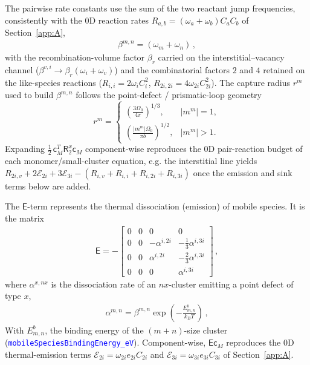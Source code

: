 \documentclass{article}
\newcommand{\textttclr}[1]{\textcolor{blue}{\texttt{#1}}}
\newcommand{\spvec}[1]{\bm{\mathsf{#1}}}   %
\newcommand{\spmat}[1]{\bm{\mathsf{#1}}}   %
\begin{document}
The pairwise rate constants use the sum of the two reactant jump frequencies, consistently with the $0$D reaction rates $R_{a,b}=(\omega_a+\omega_b)C_aC_b$ of Section~\ref{app:A},
\begin{align}\label{eq:beta}
\beta^{m,n}=(\omega_m+\omega_n)\, ,
\end{align}
with the recombination-volume factor $\beta_r$ carried on the interstitial--vacancy channel ($\beta^{v,i}\to\beta_r(\omega_i+\omega_v)$) and the combinatorial factors $2$ and $4$ retained on the like-species reactions ($R_{i,i}=2\omega_iC_i^2$, $R_{2i,2i}=4\omega_{2i}C_{2i}^2$). The capture radius $r^m$ used to build $\beta^{m,n}$ follows the point-defect / prismatic-loop geometry
\begin{equation}
    r^m =
    \begin{cases}
        \displaystyle
        \left(\frac{3\Omega_0}{4\pi}\right)^{1/3},
        & \left|m^m\right|=1,
        \\[10pt]
        \displaystyle
        \left(\frac{\left|m^m\right|\Omega_0}{\pi b}\right)^{1/2},
        & \left|m^m\right|>1.
    \end{cases}
    \label{eq:mobile_capture_radius}
\end{equation}
Expanding $\tfrac12\,\spvec{c}_M^T\spmat{R}_2^{x}\spvec{c}_M$ component-wise reproduces the $0$D pair-reaction budget of each monomer/small-cluster equation, e.g. the interstitial line yields $R_{2i,v}+2\mathcal{E}_{2i}+3\mathcal{E}_{3i}-(R_{i,v}+R_{i,i}+R_{i,2i}+R_{i,3i})$ once the emission and sink terms below are added.

The $\spmat{E}$-term represents the thermal dissociation (emission) of mobile species. It is the matrix
\begin{align}\label{Eq:R1}
   {\spmat{E}} =  -
\begin{bmatrix}
 0 & 0 & 0 & 0 \\ 
0 & 0 & -\alpha^{i,2i} & -\tfrac{1}{3}\alpha^{i,3i}\\ 
0 & 0 & \alpha^{i,2i} & -\tfrac{2}{3}\alpha^{i,3i} \\ 
0 & 0 & 0 &    \alpha^{i,3i}
\end{bmatrix}\, ,
\end{align}
where $\alpha^{x,nx}$ is the dissociation rate of an $nx$-cluster emitting a point defect of type $x$,
\begin{align}
    \alpha^{m,n} = \beta^{m,n} \exp{ \left( -\frac{E^b_{m,n}}{k_B T} \right)}\, ,\label{eq:alpha}
\end{align}
With $E^b_{m,n}$, the binding energy of the $(m+n)$-size cluster (\textttclr{mobileSpeciesBindingEnergy\_eV}). Component-wise, $\spmat{E}\spvec{c}_M$ reproduces the $0$D thermal-emission terms $\mathcal{E}_{2i}=\omega_{2i}e_{2i}C_{2i}$ and $\mathcal{E}_{3i}=\omega_{3i}e_{3i}C_{3i}$ of Section~\ref{app:A}.
\end{document}
